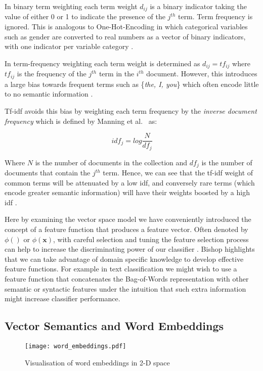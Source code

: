 \documentclass[Dissertation.tex]{subfiles}
\begin{document}
In binary term weighting each term weight $ d_{ij} $ is a binary indicator taking the value of either 0 or 1 to indicate the presence of the $ j^{th} $ term. Term frequency is ignored. This is analogous to One-Hot-Encoding in which categorical variables such as gender are converted to real numbers as a vector of binary indicators, with one indicator per variable category \cite{geronHandsonMachineLearning2017}.

In term-frequency weighting each term weight is determined as $d_{ij} = tf_{ij}$ where $tf_{ij}$ is the frequency of the $ j^{th}$ term in the $i^{th}$ document. However, this introduces a large bias towards frequent terms such as \{\textit{the, I, you}\} which often encode little to no semantic information \cite{manningIntroductionInformationRetrieval2009}.

Tf-idf avoids this bias by weighting each term frequency by the \textit{inverse document frequency} which is defined by Manning et al.\ \cite{manningIntroductionInformationRetrieval2009} as:

$$idf_j = log \frac{N}{df_j} $$

Where $ N $ is the number of documents in the collection and $ df_j $ is the number of documents that contain the $ j^{th} $ term. Hence, we can see that the tf-idf weight of common terms will be attenuated by a low idf, and conversely rare terms (which encode greater semantic information) will have their weights boosted by a high idf \cite{manningIntroductionInformationRetrieval2009}.

Here by examining the vector space model we have conveniently introduced the concept of a feature function that produces a feature vector. Often denoted by $ \phi() $ or $ \phi(\mathbf{x}) $,  with careful selection and tuning the feature selection process can help to increase the discriminating power of our classifier \cite{bishopPatternRecognitionMachine2006}. Bishop \cite{bishopPatternRecognitionMachine2006} highlights that we can take advantage of domain specific knowledge to develop effective feature functions. For example in text classification we might wish to use a feature function that concatenates the Bag-of-Words representation with other semantic or syntactic features under the intuition that such extra information might increase classifier performance. 

\subsection{Vector Semantics and Word Embeddings}\label{sec:vecSeman}
\begin{figure}[h]
	\centering
	\texttt{[image: word\_embeddings.pdf]}
	\caption{Visualisation of word embeddings in 2-D
		\label{fig:wordEmbeds} space}
\end{figure}
\end{document}
